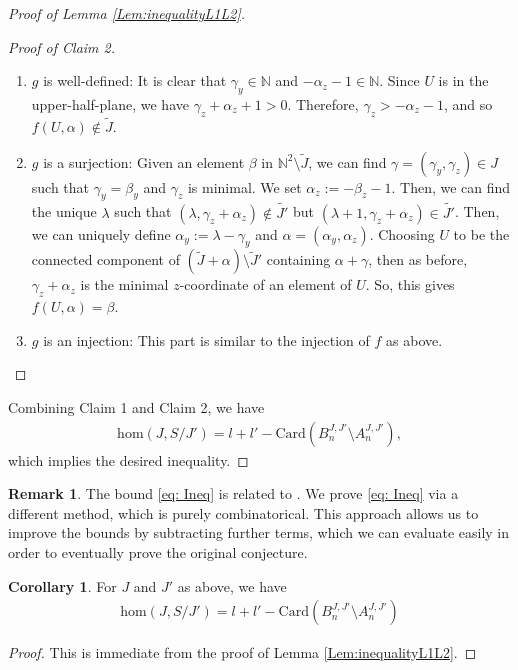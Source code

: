 \documentclass[11pt,a4paper,leqno,noamsfonts]{amsart}
\numberwithin{equation}{section}
\newcommand{\BN}{{\mathbb{N}}}
\theoremstyle{definition}
\newtheorem{remark}[definition]{Remark}
\theoremstyle{thm}
\newtheorem{corollary}[definition]{Corollary}
\theoremstyle{ex}
\theoremstyle{sol}
\begin{document}
\begin{proof}[Proof of Lemma \ref{Lem:inequalityL1L2}]
\begin{proof}[Proof of Claim 2]
\begin{enumerate}
    \item $g$ is well-defined: It is clear that $\gamma_y \in \BN$ and $-\alpha_z-1\in\BN$. Since $U$ is in the upper-half-plane, we have $\gamma_z+\alpha_z+1> 0$. Therefore, $\gamma_z>-\alpha_z-1$, and so $f(U,\alpha)\notin\tilde{J}$.
    \item $g$ is a surjection: Given an element $\beta$ in $\mathbb{N}^2\setminus\tilde{J}$, we can find $\gamma=(\gamma_y,\gamma_z)\in J$ such that $\gamma_y=\beta_y$ and $\gamma_z$ is minimal. We set $\alpha_z:=-\beta_z-1$. Then, we can find the unique $\lambda$ such that $(\lambda,\gamma_z+\alpha_z)\notin\tilde{J'}$ but $(\lambda+1,\gamma_z+\alpha_z)\in\tilde{J'}$. Then, we can uniquely define $\alpha_y:=\lambda-\gamma_y$ and $\alpha=(\alpha_y,\alpha_z)$. Choosing $U$ to be the connected component of $(\tilde{J}+\alpha)\setminus\tilde{J}'$ containing $\alpha+\gamma$, then as before, $\gamma_z+\alpha_z$ is the minimal $z$-coordinate of an element of $U$. So, this gives $f(U,\alpha)=\beta$.
    \item $g$ is an injection: This part is similar to the injection of $f$ as above.
\end{enumerate}
    
\end{proof}


Combining Claim 1 and Claim 2, we have
\begin{align*}
    \mathrm{hom}(J,S/J')= l+l'-\mathrm{Card}( B^{J,J'}_n\setminus A^{J,J'}_n),
    \end{align*}
which implies the desired inequality.
\end{proof}

\begin{remark}
    The bound \eqref{eq: Ineq} is related to  \cite[Proposition 4.1]{Ramkumar-Sammartano}. We prove \eqref{eq: Ineq}  via a different method, which is purely combinatorical. This approach allows us to improve the bounds by subtracting further terms, which we can evaluate easily in order to eventually prove the original conjecture.
\end{remark}






\begin{corollary} \label{Cor:An'An}
    For $J$ and $J'$ as above, we have
    \begin{align}
        \mathrm{hom}(J,S/J')=l+l'-\mathrm{Card}( B^{J,J'}_n\setminus A^{J,J'}_n)
    \end{align}
\end{corollary}
\begin{proof}
    This is immediate from the proof of Lemma \ref{Lem:inequalityL1L2}.
\end{proof}
\end{document}
